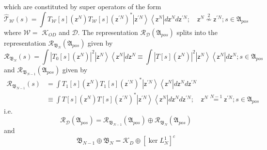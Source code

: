 \documentclass[aps,preprint]{revtex4}%
\begin{document}
which are constituted by super operators of the form
\begin{equation}
\mathcal{\hat{T}}_{\mathcal{W}}\left(  s\right)  =\int T_{\mathcal{W}}\left[
s\right]  \left(  \mathsf{z}^{N}\right)  T_{\mathcal{W}}\left[  s\right]
\left(  \mathsf{z}^{\prime N}\right)  ^{\ast}\left\vert \mathsf{z}^{\prime
N}\right\rangle \left\langle \mathsf{z}^{N}\right\vert d\mathsf{z}%
^{N}d\mathsf{z}^{\prime N};\quad\mathsf{z}^{N}\overset{2}{\nsim}%
\mathsf{z}^{\prime N};s\in\mathfrak{A}_{pos}%
\end{equation}
where $\mathcal{W}=$ $\mathcal{K}_{OD}$ and $\mathcal{D}$. The representation
$\mathcal{R}_{\mathcal{D}}\left(  \mathfrak{A}_{pos}\right)  $ splits into the
representation $\mathcal{R}_{\mathfrak{B}_{N}}\left(  \mathfrak{A}%
_{pos}\right)  $ given by
\begin{equation}
\mathcal{R}_{\mathfrak{B}_{N}}\left(  s\right)  =\int\left\vert T_{0}\left[
s\right]  \left(  \mathsf{z}^{N}\right)  \right\vert ^{2}\left\vert
\mathsf{z}^{N}\right\rangle \left\langle \mathsf{z}^{N}\right\vert
d\mathsf{z}^{N}\equiv\int\left\vert T\left[  s\right]  \left(  \mathsf{z}%
^{N}\right)  \right\vert ^{2}\left\vert \mathsf{z}^{N}\right\rangle
\left\langle \mathsf{z}^{N}\right\vert d\mathsf{z}^{N};s\in\mathfrak{A}_{pos}%
\end{equation}
and $\mathcal{R}_{\mathfrak{B}_{N-1}}\left(  \mathfrak{A}_{pos}\right)  $
given by
\begin{align}
\mathcal{R}_{\mathfrak{B}_{N-1}}\left(  s\right)   &  =\int T_{1}\left[
s\right]  \left(  \mathsf{z}^{N}\right)  T_{1}\left[  s\right]  \left(
\mathsf{z}^{\prime N}\right)  ^{\ast}\left\vert \mathsf{z}^{\prime
N}\right\rangle \left\langle \mathsf{z}^{N}\right\vert d\mathsf{z}%
^{N}d\mathsf{z}^{\prime N}\nonumber\\
&  \equiv\int T\left[  s\right]  \left(  \mathsf{z}^{N}\right)  T\left[
s\right]  \left(  \mathsf{z}^{\prime N}\right)  ^{\ast}\left\vert
\mathsf{z}^{\prime N}\right\rangle \left\langle \mathsf{z}^{N}\right\vert
d\mathsf{z}^{N}d\mathsf{z}^{\prime N};\quad\mathsf{z}^{N}\overset{N-1}%
{=}\mathsf{z}^{\prime N};s\in\mathfrak{A}_{pos}%
\end{align}
i.e.%
\begin{equation}
\mathcal{R}_{\mathcal{D}}\left(  \mathfrak{A}_{pos}\right)  =\mathcal{R}%
_{\mathfrak{B}_{N-1}}\left(  \mathfrak{A}_{pos}\right)  \oplus\mathcal{R}%
_{\mathfrak{B}_{N}}\left(  \mathfrak{A}_{pos}\right)
\end{equation}
and
\begin{equation}
\mathfrak{B}_{N-1}\oplus\mathfrak{B}_{N}=\mathcal{K}_{D}\oplus\left[  \ker
L_{N}^{1}\right]  ^{c}%
\end{equation}
\end{document}
